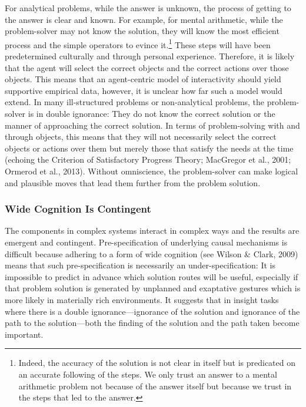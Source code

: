 For analytical problems, while the answer is unknown, the process of
getting to the answer is clear and known. For example, for mental
arithmetic, while the problem-solver may not know the solution, they
will know the most efficient process and the simple operators to evince
it.\footnote{Indeed, the accuracy of the solution is not clear in itself
  but is predicated on an accurate following of the steps. We only trust
  an answer to a mental arithmetic problem not because of the answer
  itself but because we trust in the steps that led to the answer.}
These steps will have been predetermined culturally and through personal
experience. Therefore, it is likely that the agent will select the
correct objects and the correct actions over those objects. This means
that an agent-centric model of interactivity should yield supportive
empirical data, however, it is unclear how far such a model would
extend. In many ill-structured problems or non-analytical problems, the
problem-solver is in double ignorance: They do not know the correct
solution or the manner of approaching the correct solution. In terms of
problem-solving with and through objects, this means that they will not
necessarily select the correct objects or actions over them but merely
those that satisfy the needs at the time (echoing the Criterion of
Satisfactory Progress Theory; MacGregor et al., 2001; Ormerod et al.,
2013). Without omniscience, the problem-solver can make logical and
plausible moves that lead them further from the problem solution.

\hypertarget{wide-cognition-is-contingent}{%
\subsubsection{Wide Cognition Is
Contingent}\label{wide-cognition-is-contingent}}

The components in complex systems interact in complex ways and the
results are emergent and contingent. Pre-specification of underlying
causal mechanisms is difficult because adhering to a form of wide
cognition (see Wilson \& Clark, 2009) means that such pre-specification
is necessarily an under-specification: It is impossible to predict in
advance which solution routes will be useful, especially if that problem
solution is generated by unplanned and exaptative gestures which is more
likely in materially rich environments. It suggests that in insight
tasks where there is a double ignorance---ignorance of the solution and
ignorance of the path to the solution---both the finding of the solution
and the path taken become important.

